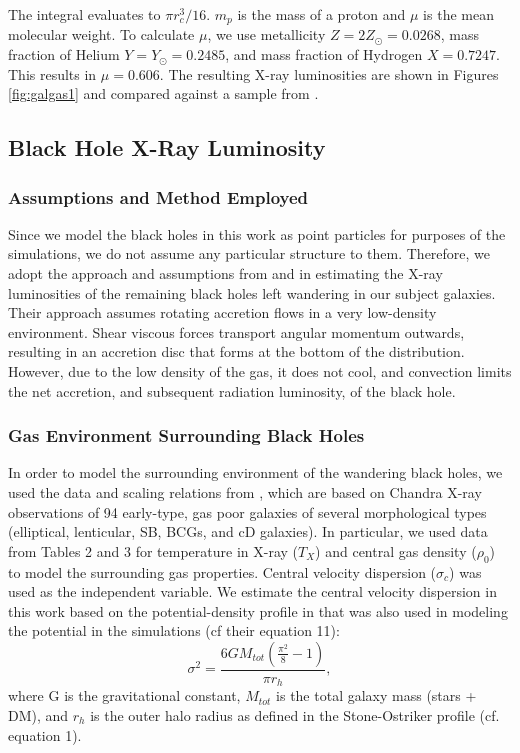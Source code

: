 \documentclass[fleqn,usenatbib,useAMS]{mnras}
\begin{document}
The integral evaluates to ${\pi}r_c^3/16$.  $m_p$ is the mass of a proton and $\mu$ is the mean molecular weight.  To calculate $\mu$, we use metallicity $Z=2Z_{\odot}=0.0268$, mass fraction of Helium $Y=Y_{\odot}=0.2485$, and mass fraction of Hydrogen $X=0.7247$.  This results in $\mu=0.606$. The resulting X-ray luminosities are shown in Figures \ref{fig:galgas1} and compared against a sample from \citet{2018ApJ...857...32B}.

\subsection{Black Hole X-Ray Luminosity}
\subsubsection{Assumptions and Method Employed}
Since we model the black holes in this work as point particles for purposes of the simulations, we do not assume any particular structure to them.  Therefore, we adopt the approach and assumptions from \citealt{2018MNRAS.476.1412I} and \citealt{2019MNRAS.486.5377I} in estimating the X-ray luminosities of the remaining black holes left wandering in our subject galaxies.  Their approach assumes rotating accretion flows in a very low-density environment.  Shear viscous forces transport angular momentum outwards, resulting in an accretion disc that forms at the bottom of the distribution.  However, due to the low density of the gas, it does not cool, and convection limits the net accretion, and subsequent radiation luminosity, of the black hole.

\subsubsection{Gas Environment Surrounding Black Holes}
In order to model the surrounding environment of the wandering black holes, we used the data and scaling relations from \citet{2018ApJ...857...32B}, which are based on Chandra X-ray observations of 94 early-type, gas poor galaxies of several morphological types (elliptical, lenticular, SB, BCGs, and cD galaxies).  In particular, we used data from Tables 2 and 3 for temperature in X-ray ($T_X$) and central gas density ($\rho_0$) to model the surrounding gas properties.  Central velocity dispersion ($\sigma_c$) was used as the independent variable.  We estimate the central velocity dispersion in this work based on the potential-density profile in  \citet{2015ApJ...806L..28S} that was also used in modeling the potential in the simulations (cf their equation 11):
\begin{equation}
    \sigma^2 = \frac{6GM_{tot}(\frac{\pi^2}{8}-1)}{{\pi}r_h},
\end{equation}
where G is the gravitational constant, $M_{tot}$ is the total galaxy mass (stars + DM), and $r_h$ is the outer halo radius as defined in the Stone-Ostriker profile (cf. equation 1).
\end{document}
